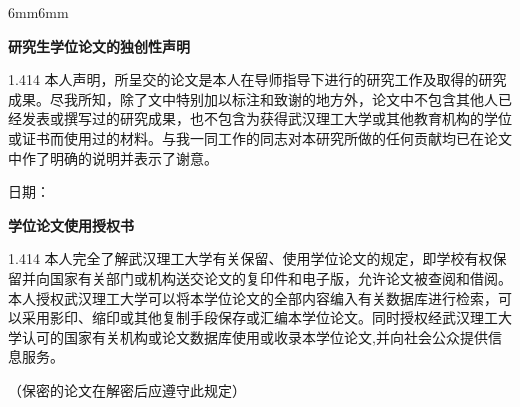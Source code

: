 \begin{titlepage}

\begin{adjustwidth}{6mm}{6mm}

\makebox[30mm]{\vspace{0mm}}

\begin{center}
\heiti \textbf{研究生学位论文的独创性声明}  %
\end{center}
\vspace{0.5\baselineskip}  %
\begin{spacing}{1.414}      %
\STZhongsong 本人声明，所呈交的论文是本人在导师指导下进行的研究工作及取得的研究成果。尽我所知，除了文中特别加以标注和致谢的地方外，论文中不包含其他人已经发表或撰写过的研究成果，也不包含为获得武汉理工大学或其他教育机构的学位或证书而使用过的材料。与我一同工作的同志对本研究所做的任何贡献均已在论文中作了明确的说明并表示了谢意。
\end{spacing}
\vspace{0.5\baselineskip}  %
  \hspace{42mm} {\STZhongsong 日\hspace{3mm}期：} 

\vspace{2.5\baselineskip} 

\begin{center}
\heiti \textbf{学位论文使用授权书}
\end{center}
\vspace{0.5\baselineskip}  %
\begin{spacing}{1.414}      %
\STZhongsong 本人完全了解武汉理工大学有关保留、使用学位论文的规定，即学校有权保留并向国家有关部门或机构送交论文的复印件和电子版，允许论文被查阅和借阅。本人授权武汉理工大学可以将本学位论文的全部内容编入有关数据库进行检索，可以采用影印、缩印或其他复制手段保存或汇编本学位论文。同时授权经武汉理工大学认可的国家有关机构或论文数据库使用或收录本学位论文,并向社会公众提供信息服务。
\end{spacing}
\vspace{0.5\baselineskip}  %

{\STZhongsong（保密的论文在解密后应遵守此规定）}


\end{adjustwidth}
\end{titlepage}
